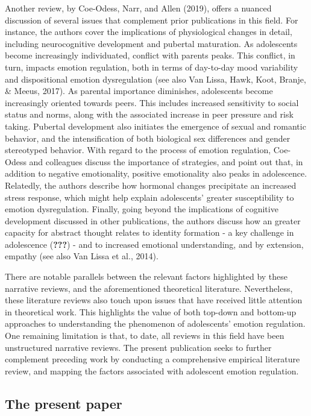 \documentclass[
  english,
  man]{apa6}
\begin{document}
Another review, by Coe-Odess, Narr, and Allen (2019), offers a nuanced
discussion of several issues that complement prior publications in this field.
For instance, the authors cover the implications of physiological changes in
detail, including neurocognitive development and pubertal maturation. As
adolescents become increasingly individuated, conflict with parents peaks. This
conflict, in turn, impacts emotion regulation, both in terms of day-to-day mood
variability and dispositional emotion dysregulation (see also Van Lissa, Hawk, Koot, Branje, \& Meeus, 2017). As parental importance diminishes,
adolescents become increasingly oriented towards peers. This includes increased
sensitivity to social status and norms, along with the associated increase in
peer pressure and risk taking. Pubertal development also initiates the
emergence of sexual and romantic behavior, and the intensification of both
biological sex differences and gender stereotyped behavior. With regard to the
process of emotion regulation, Coe-Odess and colleagues discuss the importance
of strategies, and point out that, in addition to negative emotionality,
positive emotionality also peaks in adolescence. Relatedly, the authors
describe how hormonal changes precipitate an increased stress response, which
might help explain adolescents' greater susceptibility to emotion
dysregulation. Finally, going beyond the implications of cognitive development
discussed in other publications, the authors discuss how an greater capacity
for abstract thought relates to identity formation - a key challenge in
adolescence ({\textbf{???}}) - and to increased emotional
understanding, and by extension, empathy (see also Van Lissa et al., 2014).

There are notable parallels between the relevant factors highlighted by these
narrative reviews, and the aforementioned theoretical literature. Nevertheless,
these literature reviews also touch upon issues that have received little
attention in theoretical work. This highlights the value of both top-down and
bottom-up approaches to understanding the phenomenon of adolescents' emotion
regulation. One remaining limitation is that, to date, all reviews in this
field have been unstructured narrative reviews. The present publication seeks
to further complement preceding work by conducting a comprehensive empirical
literature review, and mapping the factors associated with adolescent emotion
regulation.

\hypertarget{the-present-paper}{%
\subsection{The present paper}\label{the-present-paper}}
\end{document}
